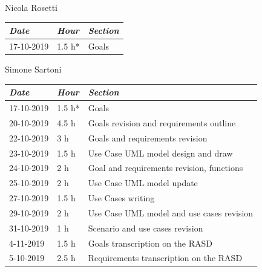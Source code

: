 \documentclass[a4paper]{report}
\begin{document}
\begin{center}
Nicola Rosetti \\
\begin{tabular}{p{2cm}p{1.5cm}p{7cm}}
\toprule
\textit{Date} & \textit{Hour} & \textit{Section} \\ \midrule
17-10-2019 & 1.5 h* & Goals \\
\bottomrule
\end{tabular}
\end{center}
\vspace*{1 cm}
\begin{center}
Simone Sartoni \\
\begin{tabular}{p{2cm}p{1.5cm}p{7cm}}
\toprule
\textit{Date} & \textit{Hour} & \textit{Section} \\ \midrule
17-10-2019 & 1.5 h* & Goals \\ \midrule
20-10-2019 & 4.5 h & Goals revision and requirements outline  \\ \midrule
22-10-2019 & 3 h & Goals and requirements revision \\ \midrule
23-10-2019 & 1.5 h & Use Case UML model design and draw \\ \midrule
24-10-2019 & 2 h & Goal and requirements revision, functions \\ \midrule
25-10-2019 & 2 h & Use Case UML model update \\ \midrule
27-10-2019 & 1.5 h & Use Cases writing \\ \midrule
29-10-2019 & 2 h & Use Case UML model and use cases revision \\ \midrule
31-10-2019 & 1 h & Scenario and use cases revision \\ \midrule
4-11-2019 & 1.5 h & Goals transcription on the RASD \\ \midrule
5-10-2019 & 2.5 h & Requirements transcription on the RASD \\ \midrule
\bottomrule
\end{tabular}
\end{center}
\vspace*{1 cm}
\end{document}
